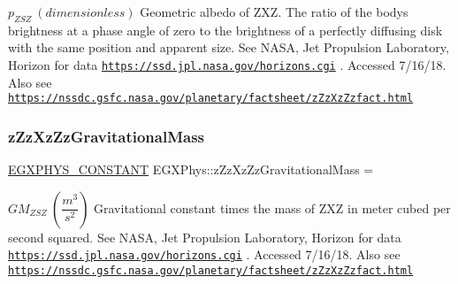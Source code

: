 $ p_{ZSZ} \ (dimensionless)$ Geometric albedo of Z\+XZ. The ratio of the body\textquotesingle{}s brightness at a phase angle of zero to the brightness of a perfectly diffusing disk with the same position and apparent size. See N\+A\+SA, Jet Propulsion Laboratory, Horizon for data \href{https://ssd.jpl.nasa.gov/horizons.cgi}{\tt https\+://ssd.\+jpl.\+nasa.\+gov/horizons.\+cgi} . Accessed 7/16/18. Also see \href{https://nssdc.gsfc.nasa.gov/planetary/factsheet/zZzXzZzfact.html}{\tt https\+://nssdc.\+gsfc.\+nasa.\+gov/planetary/factsheet/z\+Zz\+Xz\+Zzfact.\+html} \mbox{\label{group___e_g_x_phys-_constants-_astrophysics-_solar_system-_z_x_z-_bulk_gadd0fcfd10f646a5b4e5d41f4b96e2d23}} 
\subsubsection{\texorpdfstring{z\+Zz\+Xz\+Zz\+Gravitational\+Mass}{zZzXzZzGravitationalMass}}
{\footnotesize\ttfamily \mbox{\hyperlink{group___e_g_x_phys-_constants-_macros_ga76980d288494ce1714c9ac68a95ba702}{E\+G\+X\+P\+H\+Y\+S\+\_\+\+C\+O\+N\+S\+T\+A\+NT}} E\+G\+X\+Phys\+::z\+Zz\+Xz\+Zz\+Gravitational\+Mass =}

$ GM_{ZSZ} \ (\dfrac{m^3}{s^2})$ Gravitational constant times the mass of Z\+XZ in meter cubed per second squared. See N\+A\+SA, Jet Propulsion Laboratory, Horizon for data \href{https://ssd.jpl.nasa.gov/horizons.cgi}{\tt https\+://ssd.\+jpl.\+nasa.\+gov/horizons.\+cgi} . Accessed 7/16/18. Also see \href{https://nssdc.gsfc.nasa.gov/planetary/factsheet/zZzXzZzfact.html}{\tt https\+://nssdc.\+gsfc.\+nasa.\+gov/planetary/factsheet/z\+Zz\+Xz\+Zzfact.\+html} \mbox{\label{group___e_g_x_phys-_constants-_astrophysics-_solar_system-_z_x_z-_bulk_ga6f27887b6a4211d588c4b2d398de48b2}} 
